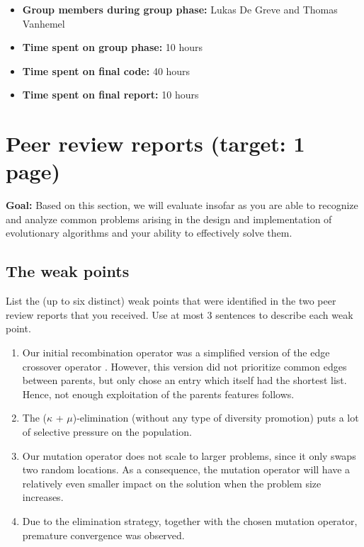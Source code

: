 \documentclass[a4paper,10pt]{article}
\newcommand{\ReplaceMe}[1]{{\color{blue}#1}}
\newcommand{\RemoveMe}[1]{{\color{purple}#1}}
\begin{document}
\begin{itemize}
 \item \textbf{Group members during group phase:} Lukas De Greve and Thomas Vanhemel
 \item \textbf{Time spent on group phase:} \ReplaceMe{10 hours} %
 \item \textbf{Time spent on final code:} \ReplaceMe{40 hours}  %
 \item \textbf{Time spent on final report:} \ReplaceMe{10 hours} %
\end{itemize}

\section{Peer review reports (target: 1 page)}

\RemoveMe{\textbf{Goal:} Based on this section, we will evaluate insofar as you are able to recognize and analyze common problems arising in the design and implementation of evolutionary algorithms and your ability to effectively solve them.}

\subsection{The weak points}
\ReplaceMe{List the (up to six distinct) weak points that were identified in the two peer review reports that you received. Use at most 3 sentences to describe each weak point.}

\begin{enumerate}
 \item Our initial recombination operator was a simplified version of the edge crossover operator \cite{initial_implementation_edge_crossover}. However, this version did not prioritize common edges between parents, but only chose an entry which itself had the shortest list. Hence, not enough exploitation of the parents features follows. 
 \item The ($\kappa$ + $\mu$)-elimination (without any type of diversity promotion) puts a lot of selective pressure on the population.
 \item Our mutation operator does not scale to larger problems, since it only swaps two random locations. As a consequence, the mutation operator will have a relatively even smaller impact on the solution when the problem size increases. 
 \item Due to the elimination strategy, together with the chosen mutation operator, premature convergence was observed.
\end{enumerate}
\end{document}
